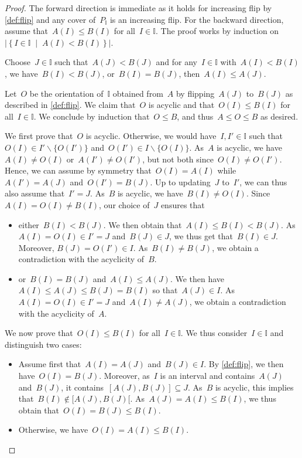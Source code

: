 \documentclass[reqno]{amsart}
\theoremstyle{definition}
\newcommand{\I}{\mathbb{I}} %
\newcommand{\set}[2]{\left\{ #1 \;\middle|\; #2 \right\}} %
\newcommand{\ssm}{\smallsetminus} %
\newcommand{\II}{\mathbb I} %
\begin{document}
\begin{proof}
The forward direction is immediate as it holds for increasing flip by \cref{def:flip} and any cover of~$P_\II$ is an increasing flip.
For the backward direction, assume that~$A(I) \le B(I)$ for all~$I \in \II$.
The proof works by induction on~$|\set{I \in \II}{A(I) < B(I)}|$.

Choose~$J \in \II$ such that~$A(J) < B(J)$ and for any~$I \in \II$ with~$A(I) < B(I)$, we have~$B(I) < B(J)$, or~$B(I) = B(J)$, then~$A(I) \le A(J)$.

Let~$O$ be the orientation of~$\I$ obtained from~$A$ by flipping~$A(J)$ to~$B(J)$ as described in \cref{def:flip}.
We claim that~$O$ is acyclic and that~$O(I) \le B(I)$ for all~$I \in \II$. 
We conclude by induction that~$O \le B$, and thus~$A \le O \le B$ as desired.

We first prove that~$O$ is acyclic.
Otherwise, we would have~$I,I' \in \II$ such that~$O(I) \in I' \ssm \{O(I')\}$ and~$O(I') \in I \ssm \{O(I)\}$.
As~$A$ is acyclic, we have~$A(I) \ne O(I)$ or~$A(I') \ne O(I')$, but not both since~$O(I) \ne O(I')$.
Hence, we can assume by symmetry that~$O(I) = A(I)$ while~$A(I') = A(J)$ and~$O(I') = B(J)$.
Up to updating~$J$ to~$I'$, we can thus also assume that~$I' = J$.
As~$B$ is acyclic, we have~$B(I) \ne O(I)$.
Since~$A(I) = O(I) \ne B(I)$, our choice of~$J$ ensures that
\begin{itemize}
\item either~$B(I) < B(J)$. 
We then obtain that~$A(I) \le B(I) < B(J)$.
As~$A(I) = O(I) \in I' = J$ and~$B(J) \in J$, we thus get that~$B(I) \in J$.
Moreover, $B(J) = O(I') \in I$.
As~$B(I) \ne B(J)$, we obtain a contradiction with the acyclicity of~$B$.
\item or~$B(I) = B(J)$ and~$A(I) \le A(J)$.
We then have~$A(I) \le A(J) \le B(J) = B(I)$ so that~$A(J) \in I$.
As~$A(I) = O(I) \in I' = J$ and~$A(I) \ne A(J)$, we obtain a contradiction with the acyclicity of~$A$.
\end{itemize}

We now prove that~$O(I) \le B(I)$ for all~$I \in \II$.
We thus consider~$I \in \II$ and distinguish two cases:
\begin{itemize}
\item Assume first that~$A(I) = A(J)$ and~$B(J) \in I$. By \cref{def:flip}, we then have~${O(I) = B(J)}$. Moreover, as~$I$ is an interval and contains~$A(J)$ and~$B(J)$, it contains~$[A(J), B(J)] \subseteq J$. As~$B$ is acyclic, this implies that~$B(I) \notin {[A(J), B(J)[}$. As~$A(J) = A(I) \le B(I)$, we thus obtain that~$O(I) = B(J) \le B(I)$.
\item Otherwise, we have~$O(I) = A(I) \le B(I)$.
\qedhere
\end{itemize}
\end{proof}
\end{document}
